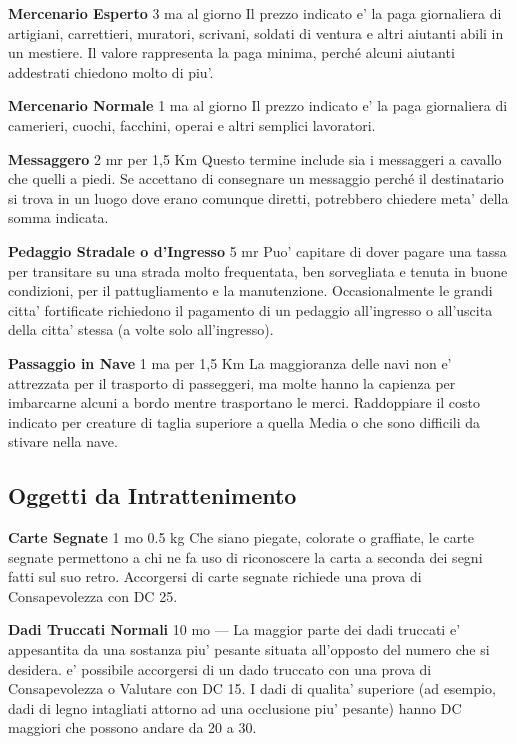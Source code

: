 \documentclass[a4paper,11pt,twoside,openany]{book}
\begin{document}
{\textbf{Mercenario Esperto} 3 ma al giorno Il prezzo indicato e' la paga giornaliera di artigiani, carrettieri, muratori, scrivani, soldati di ventura e altri aiutanti abili in un mestiere. Il valore rappresenta la paga minima, perché alcuni aiutanti addestrati chiedono molto di piu'.

\textbf{Mercenario Normale} 1 ma al giorno Il prezzo indicato e' la paga giornaliera di camerieri, cuochi, facchini, operai e altri semplici lavoratori.

\textbf{Messaggero} 2 mr per 1,5 Km Questo termine include sia i messaggeri a cavallo che quelli a piedi. Se accettano di consegnare un messaggio perché il destinatario si trova in un luogo dove erano comunque diretti, potrebbero chiedere meta' della somma indicata.

\textbf{Pedaggio Stradale o d'Ingresso} 5 mr Puo' capitare di dover pagare una tassa per transitare su una strada molto frequentata, ben sorvegliata e tenuta in buone condizioni, per il pattugliamento e la manutenzione. Occasionalmente le grandi citta' fortificate richiedono il pagamento di un pedaggio all'ingresso o all'uscita della citta' stessa (a volte solo all'ingresso).

\textbf{Passaggio in Nave} 1 ma per 1,5 Km La maggioranza delle navi non e' attrezzata per il trasporto di passeggeri, ma molte hanno la capienza per imbarcarne alcuni a bordo mentre trasportano le merci. Raddoppiare il costo indicato per creature di taglia superiore a quella Media o che sono difficili da stivare nella nave.

\subsection{Oggetti da Intrattenimento}

\label{oggetti-da-intrattenimento}

\textbf{Carte Segnate} 1 mo 0.5 kg Che siano piegate, colorate o graffiate, le carte segnate permettono a chi ne fa uso di riconoscere la carta a seconda dei segni fatti sul suo retro. Accorgersi di carte segnate richiede una prova di Consapevolezza con DC 25.

\textbf{Dadi Truccati Normali} 10 mo --- La maggior parte dei dadi truccati e' appesantita da una sostanza piu' pesante situata all'opposto del numero che si desidera. e' possibile accorgersi di un dado truccato con una prova di Consapevolezza o Valutare con DC 15. I dadi di qualita' superiore (ad esempio, dadi di legno intagliati attorno ad una occlusione piu' pesante) hanno DC maggiori che possono andare da 20 a 30.

}
\end{document}
